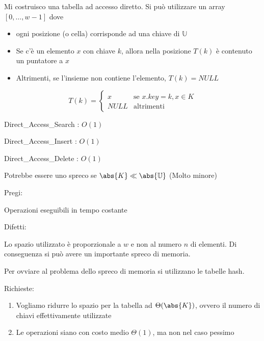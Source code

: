 \documentclass[11pt,a4paper,twoside,openright]{book}
\providecommand{\tightlist}{\setlength{\itemsep}{0pt}\setlength{\parskip}{0pt}}
\begin{document}
{Mi costruisco una tabella ad accesso diretto. Si può utilizzare un array $[0,\ldots,w-1]$ dove}

\begin{itemize}
\tightlist
\item
  {ogni posizione (o cella) corrisponde ad una chiave di $\mathbb{U}$}
\item
  {Se c'è un elemento $x$ con chiave $k$, allora nella posizione $T(k)$ è contenuto un puntatore a $x$}
\item
  {Altrimenti, se l'insieme non contiene l'elemento, $T(k) = NULL$}
\end{itemize}

\begin{equation}
T(k) = 
\begin{cases}
x & \mbox{se } x.key=k, x\in K \\ 
NULL & \mbox{altrimenti} 
\end{cases}
\end{equation}

{Direct\_Access\_Search : }$O(1)$



{Direct\_Access\_Insert : $O(1)$}



{Direct\_Access\_Delete : $O(1)$}



{Potrebbe essere uno spreco se $\abs{K} \ll \abs{\mathbb{U}}$ (Molto minore)}

{Pregi:}

{Operazioni eseguibili in tempo costante}

{Difetti:}

{Lo spazio utilizzato è proporzionale a $w$ e non al numero $n$ di elementi. Di conseguenza si può avere un importante spreco di memoria.}

{Per ovviare al problema dello spreco di memoria si utilizzano le tabelle hash.}

{Richieste:}

\begin{enumerate}
\tightlist
\item
  {Vogliamo ridurre lo spazio per la tabella ad $\Theta(\abs{K})$, ovvero il numero di chiavi
  effettivamente utilizzate}
\item
  {Le operazioni siano con costo medio $\Theta(1)$, ma non nel caso pessimo}
\end{enumerate}
\end{document}
